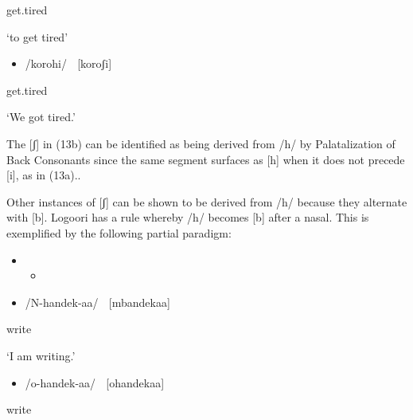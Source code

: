get.tired

‘to get tired’ \citep[38]{Leung1991}

\begin{itemize}
\item /korohi/    [koroʃi]

\end{itemize}

get.tired

‘We got tired.’ \citep[38]{Leung1991}

The [ʃ] in (13b) can be identified as being derived from /h/ by Palatalization of Back Consonants since the same segment surfaces as [h] when it does not precede [i], as in (13a).. 

Other instances of [ʃ] can be shown to be derived from /h/ because they alternate with [b]. Logoori has a rule whereby /h/ becomes [b] after a nasal. This is exemplified by the following partial paradigm:

\setcounter{itemize}{0}
\begin{itemize}
\item \setcounter{itemize}{0}
\begin{itemize}
\item \end{itemize}
\end{itemize}
\setcounter{itemize}{0}
\begin{itemize}
\item \begin{styleListParagraph}
/N-handek-aa/    [mbandekaa]
\end{styleListParagraph}
\end{itemize}
\begin{styleListParagraph}
write
\end{styleListParagraph}

‘I am writing.’

\begin{itemize}
\item \begin{styleListParagraph}
/o-handek-aa/    [ohandekaa]
\end{styleListParagraph}
\end{itemize}
\begin{styleListParagraph}
write
\end{styleListParagraph}

